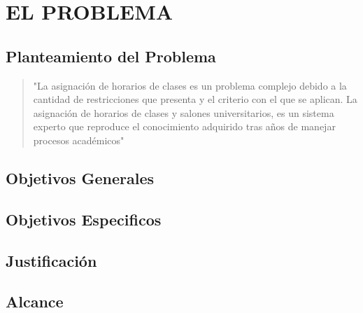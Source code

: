 \chapter{EL PROBLEMA}
\section{Planteamiento del Problema}
\begin{quote}
"La asignación de horarios de clases es un problema complejo debido a la cantidad de restricciones que presenta y el criterio con el que se aplican. La asignación de horarios de clases y salones universitarios, es un sistema experto que reproduce el conocimiento adquirido tras años de manejar procesos académicos"   
\end{quote} \cite{Jos10}
\section{Objetivos Generales}
\section{Objetivos Especificos}
\section{Justificación}
\section{Alcance}